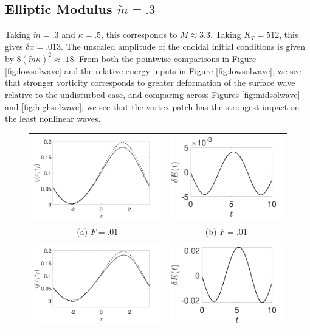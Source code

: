 \documentclass[a4paper,11pt]{article}
\begin{document}
\subsection*{Elliptic Modulus $\tilde{m}=.3$}
Taking $\tilde{m}=.3$ and $\kappa = .5$, this corresponds to $M \approx 3.3$.  Taking $K_{T}=512$, this gives $\delta x = .013$.  The unscaled amplitude of the cnoidal initial conditions is given by $8(\tilde{m}\kappa)^{2}\approx .18$.  From both the pointwise comparisons in Figure \ref{fig:lowsolwave} and the relative energy inputs in Figure \ref{fig:lowsolwave}, we see that stronger vorticity corresponds to greater deformation of the surface wave relative to the undisturbed case, and comparing across Figures \ref{fig:midsolwave} and \ref{fig:highsolwave}, we see that the vortex patch has the strongest impact on the least nonlinear waves.  
\begin{figure}
\centering
\begin{tabular}{cc}
\includegraphics[width=.45\textwidth]{profiles_wm_1_modu_pt3} & \includegraphics[width=.4\textwidth]{energy_wm_1_modu_pt3}\\
(a)  $F=.01$ & (b)  $F=.01$\\
\includegraphics[width=.45\textwidth]{profiles_wm_5_modu_pt3} & \includegraphics[width=.4\textwidth]{energy_wm_5_modu_pt3}\\

\end{tabular}
\end{figure}
\end{document}
